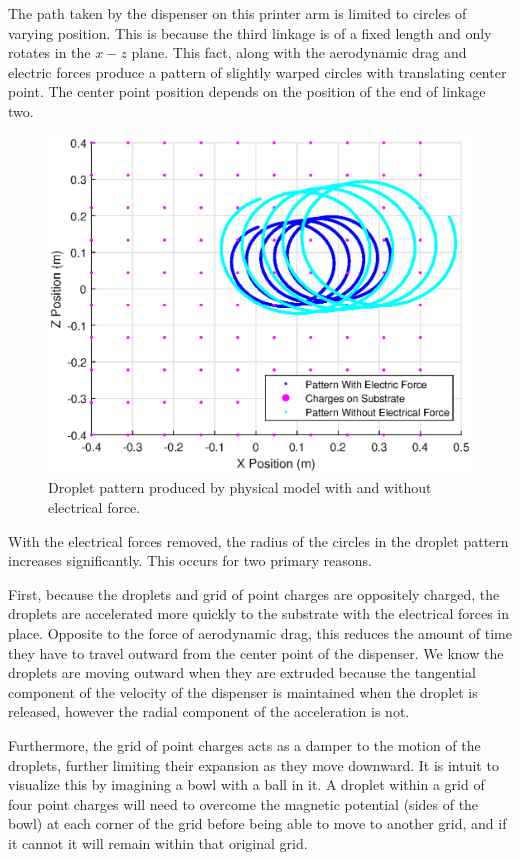 \documentclass[a4paper,12pt]{report}
\begin{document}
The path taken by the dispenser on this printer arm is limited to circles of varying position. This is because the third linkage is of a fixed length and only rotates in the $x-z$ plane. This fact, along with the aerodynamic drag and electric forces produce a pattern of slightly warped circles with translating center point. The center point position depends on the position of the end of linkage two.
\begin{figure}[H]
\begin{nscenter}
  \includegraphics[width=0.75\linewidth]{part1_5.eps}
  \caption{Droplet pattern produced by physical model with and without electrical force.}
  \end{nscenter}
\end{figure}
With the electrical forces removed, the radius of the circles in the droplet pattern increases significantly. This occurs for two primary reasons.

First, because the droplets and grid of point charges are oppositely charged, the droplets are accelerated more quickly to the substrate with the electrical forces in place. Opposite to the force of aerodynamic drag, this reduces the amount of time they have to travel outward from the center point of the dispenser. We know the droplets are moving outward when they are extruded because the tangential component of the velocity of the dispenser is maintained when the droplet is released, however the radial component of the acceleration is not.

Furthermore, the grid of point charges acts as a damper to the motion of the droplets, further limiting their expansion as they move downward. It is intuit to visualize this by imagining a bowl with a ball in it. A droplet within a grid of four point charges will need to overcome the magnetic potential (sides of the bowl) at each corner of the grid before being able to move to another grid, and if it cannot it will remain within that original grid.
\end{document}
